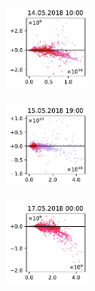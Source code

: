 \begin{figure}[H]
    \centering
    \begin{subfigure}
        \centering
        \includegraphics[width=0.30\textwidth,valign=t]{evaluation/figures/perturbations/perturbation-14.05.2018:10.00-anthropogenic-div-1.01.pdf}
    \end{subfigure}
    \begin{subfigure}
        \centering
        \includegraphics[width=0.30\textwidth,valign=t]{evaluation/figures/perturbations/perturbation-15.05.2018:19.00-anthropogenic-div-1.01.pdf}
    \end{subfigure}
    \begin{subfigure}
        \centering
        \includegraphics[width=0.30\textwidth,valign=t]{evaluation/figures/perturbations/perturbation-17.05.2018:00.00-anthropogenic-div-1.01.pdf}
    \end{subfigure}


\end{figure}
